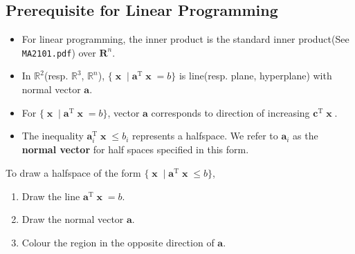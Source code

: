 \documentclass[12pt]{article}
\newcommand{\T}{\mathrm{T}}
\theoremstyle{definition}
\DeclareMathOperator{\x}{\mathbf{x}}
\begin{document}
\subsection{Prerequisite for Linear Programming}
\begin{itemize}
\item For linear programming, the inner product is the standard inner product(See \texttt{MA2101.pdf}) over $\mathbf{R}^n$.
\item In $\mathbb{R}^2$(resp. $\mathbb{R}^3$, $\mathbb{R}^n$), $\{\x\mid \mathbf{a}^\T\x=b\}$ is line(resp. plane, hyperplane) with normal vector $\mathbf{a}$.
\item For $\{\x\mid \mathbf{a}^\T\x=b\}$, vector $\mathbf{a}$ corresponds to direction of increasing $\mathbf{c}^\T\x$.
\item The inequality $\mathbf{a}_i^\T\x\leq b_i$ represents a halfspace. We refer to $\mathbf{a}_i$ as the \textbf{normal vector} for half spaces specified in this form.
\end{itemize}
To draw a halfspace of the form $\{\x\mid \mathbf{a}^\T\x\leq b\}$, 
\begin{enumerate}
  \item Draw the line $\mathbf{a}^\T\x = b$.
  \item Draw the normal vector $\mathbf{a}$.
  \item Colour the region in the opposite direction of $\mathbf{a}$.
\end{enumerate}
\end{document}

